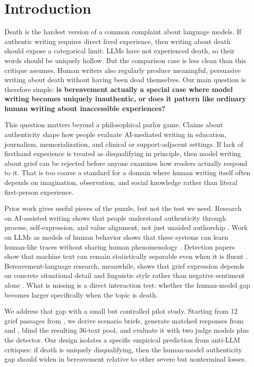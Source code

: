 \section{Introduction}
\label{sec:introduction}

Death is the hardest version of a common complaint about language models. If authentic writing requires direct lived experience, then writing about death should expose a categorical limit: LLMs have not experienced death, so their words should be uniquely hollow. But the comparison case is less clean than this critique assumes. Human writers also regularly produce meaningful, persuasive writing about death without having been dead themselves. Our main question is therefore simple: {\bf is bereavement actually a special case where model writing becomes uniquely inauthentic, or does it pattern like ordinary human writing about inaccessible experiences?}

This question matters beyond a philosophical parlor game. Claims about authenticity shape how people evaluate AI-mediated writing in education, journalism, memorialization, and clinical or support-adjacent settings. If lack of firsthand experience is treated as disqualifying in principle, then model writing about grief can be rejected before anyone examines how readers actually respond to it. That is too coarse a standard for a domain where human writing itself often depends on imagination, observation, and social knowledge rather than literal first-person experience.

Prior work gives useful pieces of the puzzle, but not the test we need. Research on AI-assisted writing shows that people understand authenticity through process, self-expression, and value alignment, not just unaided authorship \citep{hwang2024authenticity}. Work on LLMs as models of human behavior shows that these systems can learn human-like traces without sharing human phenomenology \citep{binz2023cognitive,jiang2024real}. Detection papers show that machine text can remain statistically separable even when it is fluent \citep{li2024mage}. Bereavement-language research, meanwhile, shows that grief expression depends on concrete situational detail and linguistic style rather than negative sentiment alone \citep{brubaker2012grief}. What is missing is a direct interaction test: whether the human-model gap becomes larger specifically when the topic is death.

We address that gap with a small but controlled pilot study. Starting from 12 grief passages from \aipsy \citep{keeman2026aipsy}, we derive scenario briefs, generate matched responses from \gptfive and \claudesonnet, blind the resulting 36-text pool, and evaluate it with two judge models plus the \mage detector. Our design isolates a specific empirical prediction from anti-LLM critiques: if death is uniquely disqualifying, then the human-model authenticity gap should widen in bereavement relative to other severe but nonterminal losses.

